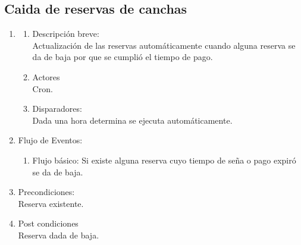 \documentclass[a4paper,11pt]{article}
\begin{document}
\subsection{Caida de reservas de canchas}
\begin{enumerate}

        \item
	\begin{enumerate}
            \item Descripción breve: \\
                Actualización de las reservas automáticamente cuando alguna reserva
                se da de baja por que se cumplió el tiempo de pago.
            \item Actores \\
                Cron.
            \item Disparadores: \\
                Dada una hora determina se ejecuta automáticamente.
        \end{enumerate}

        \item Flujo de Eventos: 

        \begin{enumerate}
            \item Flujo básico:
                Si existe alguna reserva cuyo tiempo de seña o pago expiró se da de baja.
        \end{enumerate}

        \item Precondiciones: \\
            Reserva existente.

        \item Post condiciones \\
            Reserva dada de baja.

\end{enumerate}

\end{document}
